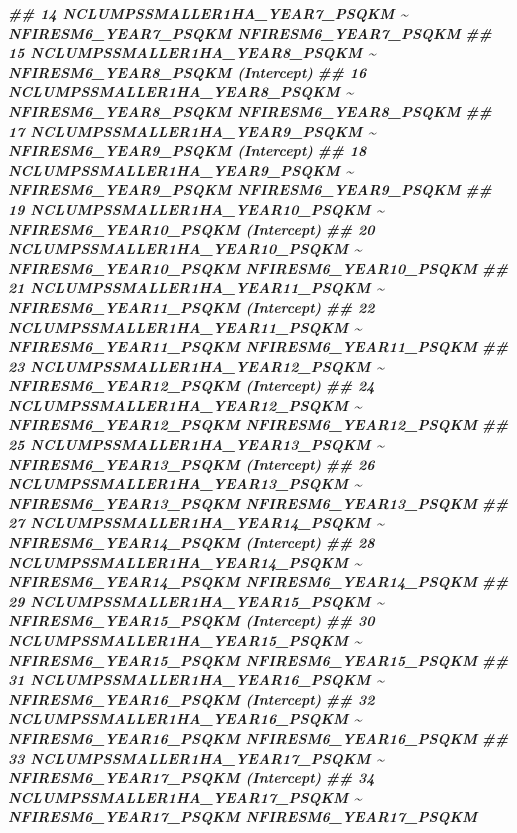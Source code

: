 \documentclass[10pt,landscape,a3paper]{article}
\newenvironment{Shaded}{\begin{snugshade}}{\end{snugshade}}
\newcommand{\DocumentationTok}[1]{\textcolor[rgb]{0.56,0.35,0.01}{\textbf{\textit{#1}}}}
\begin{document}
\begin{Shaded}
\begin{Highlighting}[]
\DocumentationTok{\#\# 14   NCLUMPSSMALLER1HA\_YEAR7\_PSQKM \textasciitilde{} NFIRESM6\_YEAR7\_PSQKM  NFIRESM6\_YEAR7\_PSQKM}
\DocumentationTok{\#\# 15   NCLUMPSSMALLER1HA\_YEAR8\_PSQKM \textasciitilde{} NFIRESM6\_YEAR8\_PSQKM           (Intercept)}
\DocumentationTok{\#\# 16   NCLUMPSSMALLER1HA\_YEAR8\_PSQKM \textasciitilde{} NFIRESM6\_YEAR8\_PSQKM  NFIRESM6\_YEAR8\_PSQKM}
\DocumentationTok{\#\# 17   NCLUMPSSMALLER1HA\_YEAR9\_PSQKM \textasciitilde{} NFIRESM6\_YEAR9\_PSQKM           (Intercept)}
\DocumentationTok{\#\# 18   NCLUMPSSMALLER1HA\_YEAR9\_PSQKM \textasciitilde{} NFIRESM6\_YEAR9\_PSQKM  NFIRESM6\_YEAR9\_PSQKM}
\DocumentationTok{\#\# 19 NCLUMPSSMALLER1HA\_YEAR10\_PSQKM \textasciitilde{} NFIRESM6\_YEAR10\_PSQKM           (Intercept)}
\DocumentationTok{\#\# 20 NCLUMPSSMALLER1HA\_YEAR10\_PSQKM \textasciitilde{} NFIRESM6\_YEAR10\_PSQKM NFIRESM6\_YEAR10\_PSQKM}
\DocumentationTok{\#\# 21 NCLUMPSSMALLER1HA\_YEAR11\_PSQKM \textasciitilde{} NFIRESM6\_YEAR11\_PSQKM           (Intercept)}
\DocumentationTok{\#\# 22 NCLUMPSSMALLER1HA\_YEAR11\_PSQKM \textasciitilde{} NFIRESM6\_YEAR11\_PSQKM NFIRESM6\_YEAR11\_PSQKM}
\DocumentationTok{\#\# 23 NCLUMPSSMALLER1HA\_YEAR12\_PSQKM \textasciitilde{} NFIRESM6\_YEAR12\_PSQKM           (Intercept)}
\DocumentationTok{\#\# 24 NCLUMPSSMALLER1HA\_YEAR12\_PSQKM \textasciitilde{} NFIRESM6\_YEAR12\_PSQKM NFIRESM6\_YEAR12\_PSQKM}
\DocumentationTok{\#\# 25 NCLUMPSSMALLER1HA\_YEAR13\_PSQKM \textasciitilde{} NFIRESM6\_YEAR13\_PSQKM           (Intercept)}
\DocumentationTok{\#\# 26 NCLUMPSSMALLER1HA\_YEAR13\_PSQKM \textasciitilde{} NFIRESM6\_YEAR13\_PSQKM NFIRESM6\_YEAR13\_PSQKM}
\DocumentationTok{\#\# 27 NCLUMPSSMALLER1HA\_YEAR14\_PSQKM \textasciitilde{} NFIRESM6\_YEAR14\_PSQKM           (Intercept)}
\DocumentationTok{\#\# 28 NCLUMPSSMALLER1HA\_YEAR14\_PSQKM \textasciitilde{} NFIRESM6\_YEAR14\_PSQKM NFIRESM6\_YEAR14\_PSQKM}
\DocumentationTok{\#\# 29 NCLUMPSSMALLER1HA\_YEAR15\_PSQKM \textasciitilde{} NFIRESM6\_YEAR15\_PSQKM           (Intercept)}
\DocumentationTok{\#\# 30 NCLUMPSSMALLER1HA\_YEAR15\_PSQKM \textasciitilde{} NFIRESM6\_YEAR15\_PSQKM NFIRESM6\_YEAR15\_PSQKM}
\DocumentationTok{\#\# 31 NCLUMPSSMALLER1HA\_YEAR16\_PSQKM \textasciitilde{} NFIRESM6\_YEAR16\_PSQKM           (Intercept)}
\DocumentationTok{\#\# 32 NCLUMPSSMALLER1HA\_YEAR16\_PSQKM \textasciitilde{} NFIRESM6\_YEAR16\_PSQKM NFIRESM6\_YEAR16\_PSQKM}
\DocumentationTok{\#\# 33 NCLUMPSSMALLER1HA\_YEAR17\_PSQKM \textasciitilde{} NFIRESM6\_YEAR17\_PSQKM           (Intercept)}
\DocumentationTok{\#\# 34 NCLUMPSSMALLER1HA\_YEAR17\_PSQKM \textasciitilde{} NFIRESM6\_YEAR17\_PSQKM NFIRESM6\_YEAR17\_PSQKM}

\end{Highlighting}
\end{Shaded}
\end{document}
